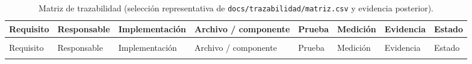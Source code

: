 \begin{landscape}
\begin{longtable}{@{}
  >{\raggedright\arraybackslash}p{1.6cm}
  >{\raggedright\arraybackslash}p{2.0cm}
  >{\raggedright\arraybackslash}p{3.6cm}
  >{\raggedright\arraybackslash}p{3.6cm}
  >{\raggedright\arraybackslash}p{3.6cm}
  >{\raggedright\arraybackslash}p{3.4cm}
  >{\raggedright\arraybackslash}p{3.6cm}
  >{\raggedright\arraybackslash}p{1.8cm}
@{}}
\caption{Matriz de trazabilidad (selecci\'on representativa de \texttt{docs/trazabilidad/matriz.csv} y evidencia posterior).}
\label{tab:trazabilidad} \\
\toprule
Requisito & Responsable & Implementaci\'on & Archivo / componente & Prueba & Medici\'on & Evidencia & Estado \\
\midrule
\endfirsthead
\multicolumn{8}{c}{\tablename\ \thetable\ -- continuaci\'on} \\
\toprule
Requisito & Responsable & Implementaci\'on & Archivo / componente & Prueba & Medici\'on & Evidencia & Estado \\
\midrule
\endhead
\bottomrule
\endfoot


\end{longtable}
\end{landscape}
